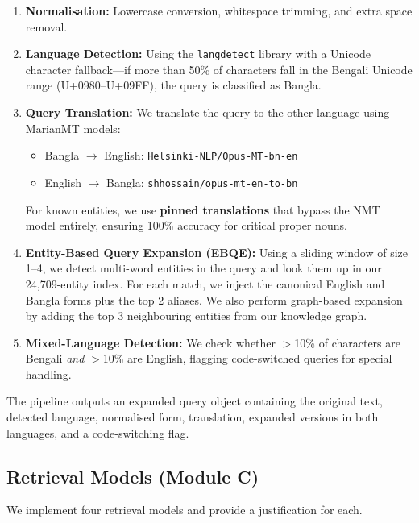 \documentclass[12pt,a4paper]{article}
\begin{document}
\begin{enumerate}
    \item \textbf{Normalisation:} Lowercase conversion, whitespace trimming, and extra space removal.

    \item \textbf{Language Detection:} Using the \texttt{langdetect} library with a Unicode character fallback---if more than 50\% of characters fall in the Bengali Unicode range (U+0980--U+09FF), the query is classified as Bangla.

    \item \textbf{Query Translation:} We translate the query to the other language using MarianMT models:
    \begin{itemize}
        \item Bangla $\rightarrow$ English: \texttt{Helsinki-NLP/Opus-MT-bn-en}
        \item English $\rightarrow$ Bangla: \texttt{shhossain/opus-mt-en-to-bn}
    \end{itemize}
    For known entities, we use \textbf{pinned translations} that bypass the NMT model entirely, ensuring 100\% accuracy for critical proper nouns.

    \item \textbf{Entity-Based Query Expansion (EBQE):} Using a sliding window of size 1--4, we detect multi-word entities in the query and look them up in our 24{,}709-entity index. For each match, we inject the canonical English and Bangla forms plus the top 2 aliases. We also perform graph-based expansion by adding the top 3 neighbouring entities from our knowledge graph.

    \item \textbf{Mixed-Language Detection:} We check whether $>$10\% of characters are Bengali \textit{and} $>$10\% are English, flagging code-switched queries for special handling.
\end{enumerate}

The pipeline outputs an expanded query object containing the original text, detected language, normalised form, translation, expanded versions in both languages, and a code-switching flag.


\subsection{Retrieval Models (Module C)}

We implement four retrieval models and provide a justification for each.
\end{document}
